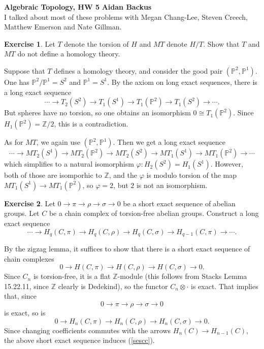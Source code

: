 \documentclass[10pt]{article}
\newcommand{\ZZ}{\mathbb{Z}}
\newcommand{\PP}{\mathbb P}
\theoremstyle{definition}
\newtheorem{exer}{Exercise}
\begin{document}
\noindent
\large\textbf{Algebraic Topology, HW 5} \hfill \textbf{Aidan Backus} \\


I talked about most of these problems with Megan Chang-Lee, Steven Creech, Matthew Emerson and Nate Gillman.

\begin{exer}
Let $T$ denote the torsion of $H$ and $MT$ denote $H/T$.
Show that $T$ and $MT$ do not define a homology theory.
\end{exer}

Suppose that $T$ defines a homology theory, and consider the good pair $(\PP^2, \PP^1)$.
One has $\PP^2/\PP^1 = S^2$ and $\PP^1 = S^1$.
By the axiom on long exact sequences, there is a long exact sequence
$$\cdots \to T_2(S^2) \to T_1(S^1) \to T_1(\PP^2) \to T_1(S^2) \to \cdots.$$
But spheres have no torsion, so one obtains an isomorphism $0 \cong T_1(\PP^2)$.
Since $H_1(\PP^2) = \ZZ/2$, this is a contradiction.

As for $MT$, we again use $(\PP^2, \PP^1)$.
Then we get a long exact sequence
$$\cdots \to MT_2(S^1) \to MT_2(\PP^2) \to MT_2(S^2) \to MT_1(S^1) \to MT_1(\PP^2) \to \cdots$$
which simplifies to a natural isomorphism $\varphi: H_2(S^2) = H_1(S^1)$.
However, both of those are isomporhic to $\ZZ$, and the $\varphi$ is modulo torsion of the map $MT_1(S^1) \to MT_1(\PP^2)$, so $\varphi = 2$, but $2$ is not an isomorphism.

\begin{exer}
Let $0 \to \pi \to \rho \to \sigma \to 0$ be a short exact sequence of abelian groups.
Let $C$ be a chain complex of torsion-free abelian groups. Construct a long exact sequence
$$\cdots \to H_q(C, \pi) \to H_q(C, \rho) \to H_q(C, \sigma) \to H_{q-1}(C, \pi) \to \cdots.$$
\end{exer}

By the zigzag lemma, it suffices to show that there is a short exact sequence of chain complexes
\begin{equation}
\label{sescc}
0 \to H(C, \pi) \to H(C, \rho) \to H(C, \sigma) \to 0.
\end{equation}
Since $C_n$ is torsion-free, it is a flat $\ZZ$-module (this follows from Stacks Lemma 15.22.11, since $\ZZ$ clearly is Dedekind), so the functor $C_n \otimes \cdot$ is exact.
That implies that, since
$$0 \to \pi \to \rho \to \sigma \to 0$$
is exact, so is
$$0 \to H_n(C, \pi) \to H_n(C, \rho) \to H_n(C, \sigma) \to 0.$$
Since changing coefficients commutes with the arrows $H_n(C) \to H_{n-1}(C)$, the above short exact sequence induces (\ref{sescc}).
\end{document}
